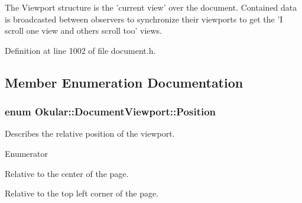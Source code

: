 The Viewport structure is the 'current view' over the document. Contained data is broadcasted between observers to synchronize their viewports to get the 'I scroll one view and others scroll too' views. 

Definition at line 1002 of file document.\+h.



\subsection{Member Enumeration Documentation}
\hypertarget{classOkular_1_1DocumentViewport_aad7228ed215e5a676cf50dabd4e41552}{
\subsubsection[{Position}]{\setlength{\rightskip}{0pt plus 5cm}enum {\bf Okular\+::\+Document\+Viewport\+::\+Position}}}\label{classOkular_1_1DocumentViewport_aad7228ed215e5a676cf50dabd4e41552}
Describes the relative position of the viewport. \begin{Desc}
\item[Enumerator]\par
\begin{description}
\item[{\em 
\hypertarget{classOkular_1_1DocumentViewport_aad7228ed215e5a676cf50dabd4e41552a254c6d87e8ba55bb53347ff32e501167}{Center}\label{classOkular_1_1DocumentViewport_aad7228ed215e5a676cf50dabd4e41552a254c6d87e8ba55bb53347ff32e501167}
}]Relative to the center of the page. \item[{\em 
\hypertarget{classOkular_1_1DocumentViewport_aad7228ed215e5a676cf50dabd4e41552a7a96c06e6321a16c2efccd08095bc59d}{Top\+Left}\label{classOkular_1_1DocumentViewport_aad7228ed215e5a676cf50dabd4e41552a7a96c06e6321a16c2efccd08095bc59d}
}]Relative to the top left corner of the page. \end{description}
\end{Desc}


